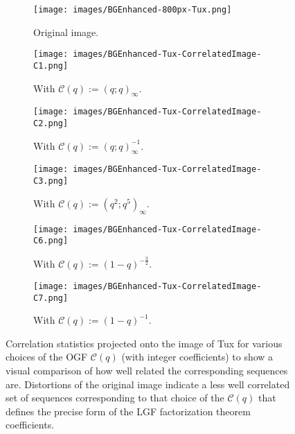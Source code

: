 \documentclass[12pt,reqno,a4letter]{article}
\numberwithin{figure}{section}
\numberwithin{table}{section}
\numberwithin{equation}{section}
\theoremstyle{plain}
\numberwithin{theorem}{section}
\theoremstyle{definition}
\begin{document}
\begin{figure}[ht!]
  
  \centering
  \begin{subfigure}[t]{.3\linewidth}
    \centering\texttt{[image: images/BGEnhanced-800px-Tux.png]}
    \caption{Original image.}
  \end{subfigure}
  \begin{subfigure}[t]{.3\linewidth}
    \centering\texttt{[image: images/BGEnhanced-Tux-CorrelatedImage-C1.png]}
    \caption{With $\mathcal{C}(q) := (q; q)_{\infty}$.}
  \end{subfigure}
  \begin{subfigure}[t]{.3\linewidth}
    \centering\texttt{[image: images/BGEnhanced-Tux-CorrelatedImage-C2.png]}
       \caption{With $\mathcal{C}(q) := (q; q)_{\infty}^{-1}$.}
  \end{subfigure}
  
  \bigskip

  \begin{subfigure}[t]{.3\linewidth}
    \centering\texttt{[image: images/BGEnhanced-Tux-CorrelatedImage-C3.png]}
    \caption{With $\mathcal{C}(q) := (q^2; q^5)_{\infty}$.}
  \end{subfigure}
  \begin{subfigure}[t]{.3\linewidth}
    \centering\texttt{[image: images/BGEnhanced-Tux-CorrelatedImage-C6.png]}
    \caption{With $\mathcal{C}(q) := (1-q)^{-\frac{3}{2}}$.}
  \end{subfigure}
  \begin{subfigure}[t]{.3\linewidth}
    \centering\texttt{[image: images/BGEnhanced-Tux-CorrelatedImage-C7.png]}
       \caption{With $\mathcal{C}(q) := (1-q)^{-1}$.}
  \end{subfigure}

  \caption[Visualization of correlation statistics for LGF factorizations]{
           Correlation statistics projected onto the image of Tux for various choices of the 
           OGF $\mathcal{C}(q)$ (with integer coefficients) to show a visual comparison of how 
           well related the corresponding sequences are. Distortions of the original image indicate 
           a less well correlated set of sequences corresponding to that choice of the 
           $\mathcal{C}(q)$ that defines the precise form of the LGF factorization theorem coefficients.}
  \label{figure_TuxedoPenguinLGFCorrelationStatsVisualizationExample_v1} 

\end{figure}
\end{document}
